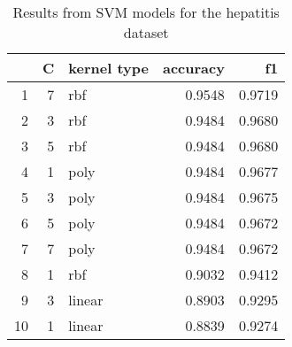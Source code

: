 \begin{table}
\caption{Results from SVM models for the hepatitis dataset}
\label{tab:svm_results_hepatitis}
\begin{tabular}{rrlrr}
\toprule
 & C & kernel type & accuracy & f1 \\
\midrule
1 & 7 & rbf & 0.9548 & 0.9719 \\
2 & 3 & rbf & 0.9484 & 0.9680 \\
3 & 5 & rbf & 0.9484 & 0.9680 \\
4 & 1 & poly & 0.9484 & 0.9677 \\
5 & 3 & poly & 0.9484 & 0.9675 \\
6 & 5 & poly & 0.9484 & 0.9672 \\
7 & 7 & poly & 0.9484 & 0.9672 \\
8 & 1 & rbf & 0.9032 & 0.9412 \\
9 & 3 & linear & 0.8903 & 0.9295 \\
10 & 1 & linear & 0.8839 & 0.9274 \\
\bottomrule
\end{tabular}
\end{table}
